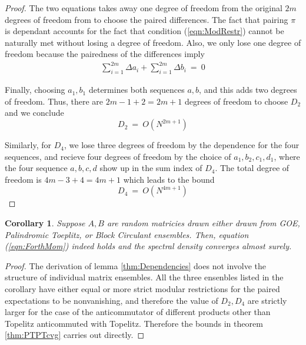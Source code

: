 \documentclass{article}
\newtheorem{cor}{Corollary}
\begin{document}
\begin{proof}
    The two equations takes away one degree of freedom from the original 
    $2m$ degrees of freedom from to choose the paired differences. The 
    fact that pairing $\pi$ is dependant accounts for the fact 
    that condition (\ref{eqn:ModRestr}) cannot be naturally met without losing a degree of freedom. 
    Also, we only lose one degree of freedom because the pairedness of the differences imply  
      \begin{eqnarray}
        \sum_{i = 1}^{2m} \Delta a_i+ \sum_{i = 1}^{2m} \Delta b_i \ =\ 0 
    \end{eqnarray}

    Finally, choosing $a_1, b_1$ determines both sequences $a, b$, and 
    this adds two degrees of freedom. Thus, there are $2m -1 + 2 = 2m + 1$ 
    degrees of freedom to choose $D_2$ and we conclude 
    \begin{equation}
        D_2 \ = \ O(N^{2m + 1})
    \end{equation}

    Similarly, for $D_4$, we lose three degrees of freedom by the dependence 
    for the four sequences, and recieve four degrees of freedom by the 
    choice of $a_1, b_2, c_1, d_1$, where the four sequence $a, b, c, d$ 
    show up in the sum index of $D_4$. The total degree of freedom is 
    $4m - 3 + 4 = 4m + 1$ which leads to the bound 
    \begin{equation}
        D_4 \ = \ O(N^{4m + 1})
    \end{equation}

\end{proof}

\begin{cor}
    Suppose $A, B$ are random matricies drawn either drawn from GOE, 
    Palindromic Toeplitz, or Block Circulant ensembles. Then, equation (\ref{eqn:ForthMom}) indeed holds and 
    the spectral density converges almost surely. 
\end{cor}

\begin{proof}
    The derivation of lemma \ref{thm:Dependencies} 
    does not involve the structure of individual matrix ensembles.
    All the three ensenbles listed in the corollary have either 
    equal or more strict modular restrictions for the paired expectations 
    to be nonvanishing, and therefore the value of $D_2, D_4$ are strictly 
    larger for the case of the anticommutator of different products 
    other than Topelitz anticommuted with Topelitz. Therefore the bounds in 
    theorem \ref{thm:PTPTcvg} carries out directly. 
\end{proof}
\end{document}
